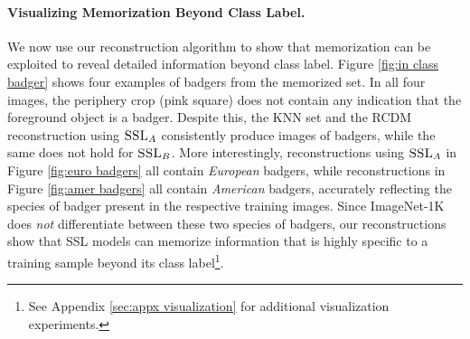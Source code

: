 \paragraph{Visualizing Memorization Beyond Class Label.}
We now use our reconstruction algorithm to show that \dejavu memorization can be exploited to reveal detailed information beyond class label. Figure \ref{fig:in class badger} shows four examples of badgers from the memorized set. In all four images, the periphery crop (pink square) does not contain any indication that the foreground object is a badger. Despite this, the KNN set and the RCDM reconstruction using $\textsc{SSL}_A$ consistently produce images of badgers, while the same does not hold for $\textsc{SSL}_B$.
More interestingly, reconstructions using $\textsc{SSL}_A$ in Figure \ref{fig:euro badgers} all contain \emph{European} badgers, while reconstructions in Figure \ref{fig:amer badgers} all contain \emph{American} badgers, accurately reflecting the species of badger present in the respective training images. Since ImageNet-1K does \emph{not} differentiate between these two species of badgers, our reconstructions show that SSL models can memorize information that is highly specific to a training sample beyond its class label\footnote{See Appendix \ref{sec:appx visualization} for additional visualization experiments.}.%




